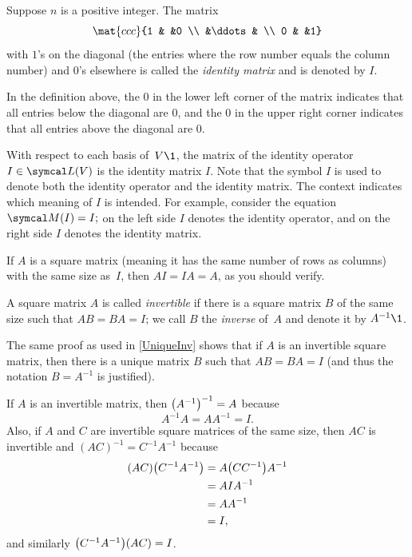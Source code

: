 {Suppose $n$ is a positive integer. The  matrix
\[
\mat{ccc}{1 & &0 \\ &\ddots & \\ 0 & &1}
\]
with $1$'s on the diagonal (the entries where the row number equals the column number) and $0$'s elsewhere is called the \emph{identity matrix} and is denoted by $I$.}

In the definition above, the $0$ in the lower left corner of the matrix indicates that all entries below the diagonal are $0$, and the $0$ in the upper right corner indicates that all entries above the diagonal are $0$.

With respect to each basis of~$V\1$, the matrix of the identity operator $I \in \L(V)$ is the identity matrix $I$. Note that the symbol $I$ is used to denote both the identity operator and the identity matrix. The context indicates which meaning of $I$ is
intended.  For example, consider the equation
$
\M(I) = I;
$
on the left side $I$ denotes the identity operator, and on the right side $I$
denotes the identity matrix.

If $A$ is a square matrix (meaning it has the same number of rows as columns) with the same size as~$I$, then $AI = IA = A$, as you should verify.

{A square matrix $A$ is called
\emph{invertible}
if there is a square matrix $B$ of the same size such that $AB = BA = I$; we call $B$ the \emph{inverse} of~$A$ and denote it by $A^{-1}\1$.}


The same proof as used in \ref{UniqueInv} shows that if $A$ is an invertible square matrix, then there is a unique matrix $B$ such that $AB = BA = I$ (and thus the notation $B = A^{-1}$ is justified).

If $A$ is an invertible matrix, then ${\paren[\big]{A^{-1}}}^{-1} = A$ because
\[
A^{-1} A = A A^{-1} = I.
\]
Also, if $A$ and $C$ are invertible square matrices of the same size, then $AC$ is invertible and $(AC)^{-1} = C^{-1} A^{-1}$ because
\begin{align*}
(AC) \paren[\big] {C^{-1} A^{-1}} &= A \paren[\big]{ C C^{-1} } A^{-1} \\
&= AIA^{-1} \\
&= A A^{-1} \\
&= I,
\end{align*}
and similarly $\paren[\big] {C^{-1} A^{-1}}(AC) = I$.

